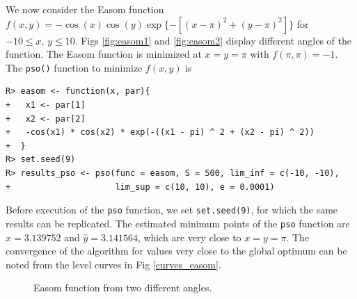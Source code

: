 \documentclass[10pt,letterpaper]{article}
\begin{document}
We now consider the Easom function $f(x,y) = -\cos(x)\cos(y)\exp\{-[(x-\pi)^2 + (y-\pi)^2]\}$ for $-10\leq x,\,y \leq 10$.
Figs \ref{fig:easom1} and \ref{fig:easom2} display different angles of the function.
The Easom function is
minimized at $x=y=\pi$ with $f(\pi,\pi)=-1$.
The \texttt{pso()} function to minimize $f(x,y)$ is

\begin{verbatim}
R> easom <- function(x, par){
+   x1 <- par[1]
+   x2 <- par[2]
+   -cos(x1) * cos(x2) * exp(-((x1 - pi) ^ 2 + (x2 - pi) ^ 2))
+  }
R> set.seed(9)
R> results_pso <- pso(func = easom, S = 500, lim_inf = c(-10, -10),
+                     lim_sup = c(10, 10), e = 0.0001)
\end{verbatim}

Before execution of the \texttt{pso} function, we set \texttt{set.seed(9)}, for which the same results can be replicated.
The estimated minimum points of the \texttt{pso} function are $\widehat{x} = 3.139752$ and $\widehat{y} = 3.141564$, which are very close to $x=y=\pi$.
The convergence of the algorithm for  values very close to the global optimum can be noted from the level curves  in Fig \ref{curves_easom}.

\begin{figure}[H]
\centering
\subfigure{
	\label{fig:easom1}
}
\subfigure{
	\label{fig:easom2}
}
\caption{Easom function from two different angles.}
\label{fig:easom}
\end{figure}
\end{document}
